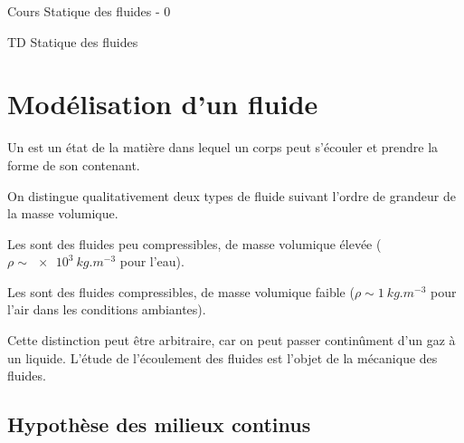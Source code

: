 \documentclass[12pt,fancy]{cours}
\begin{document}
{
\item Cours Statique des fluides - 0
\item TD Statique des fluides
}


\section{Modélisation d’un fluide}

\begin{definition}[Fluide]\label{def:}
Un  est un état de la matière dans lequel un corps peut s'écouler et prendre la forme de son contenant.
\end{definition}
 On distingue qualitativement deux types de fluide suivant l'ordre de grandeur de la masse volumique.
 \begin{liste}
  \item Les  sont des fluides peu compressibles, de masse volumique élevée ($\rho \sim \SI{e3}{kg.m^{-3}}$ pour l'eau).
  \item Les  sont des fluides compressibles, de masse volumique faible ($\rho \sim \SI{1}{kg.m^{-3}}$ pour l'air dans les conditions ambiantes).
 \end{liste}
 Cette distinction peut être arbitraire, car on peut passer continûment d'un gaz à un liquide.
 L'étude de l'écoulement des fluides est l'objet de la mécanique des fluides.
\subsection{Hypothèse des milieux continus}
\end{document}
